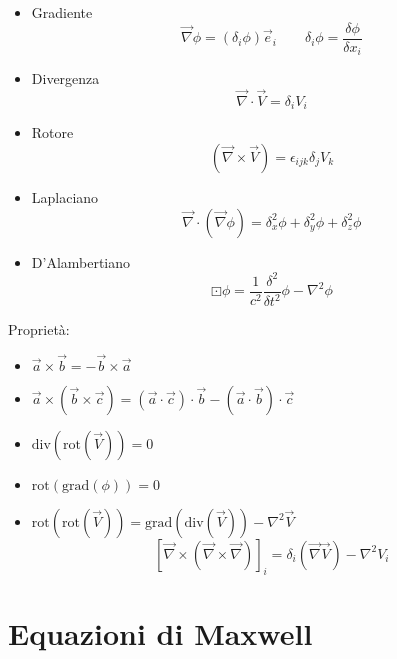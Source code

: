 \documentclass[a4paper,11pt]{report}
\theoremstyle{remark}
\theoremstyle{definition}
\newcommand{\rot}{\mbox{rot}}
\newcommand{\grad}{\mbox{grad}}
\newcommand{\Div}{\mbox{div}}
\begin{document}
\begin{itemize}
    \item Gradiente
    \begin{equation*}
        \vec{\nabla}\phi = (\delta_i\phi)\vec{e}_i \qquad \delta_i\phi= \frac{\delta \phi}{\delta x_i}
    \end{equation*}
    \item Divergenza
    \begin{equation*}
        \vec{\nabla}\cdot\vec{V} = \delta_i V_i
    \end{equation*}
    \item Rotore 
    \begin{equation*}
        {(\vec{\nabla}\times \vec{V})} = \epsilon_{ijk}\delta_j V_k
    \end{equation*}
    \item Laplaciano
    \begin{equation*}
        \vec{\nabla}\cdot (\vec{\nabla}\phi) = \delta^2_x \phi + \delta^2_y \phi + \delta^2_z \phi 
    \end{equation*}
    \item D'Alambertiano
    \begin{equation*}
        \boxdot\phi = \frac{1}{c^2}\frac{\delta^2}{\delta t^2}\phi -\nabla^2\phi 
    \end{equation*}
\end{itemize}
Proprietà:
\begin{itemize}
    \item $\vec{a} \times \vec{b} = -\vec{b} \times \vec{a}$
    \item $\vec{a} \times (\vec{b} \times \vec{c}) = (\vec{a} \cdot \vec{c})\cdot \vec{b} - (\vec{a}\cdot \vec{b})\cdot \vec{c}$
    \item $\Div(\rot(\vec{V})) =0$
    \item $\rot(\grad(\phi)) = 0$
    \item $\rot(\rot(\vec{V})) = \grad(\Div(\vec{V}))- \nabla^2\vec{V}$
    \begin{equation*}
        {[\vec{\nabla} \times (\vec{\nabla} \times \vec{\nabla})]}_i = \delta_i(\vec{\nabla}\vec{V})-\nabla^2V_i
    \end{equation*}
\end{itemize}

\section*{Equazioni di Maxwell}
\end{document}
